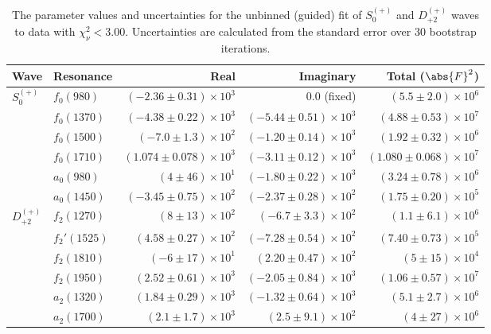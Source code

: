 \begin{table}[ht]
    \begin{center}
        \begin{tabular}{llrrr}\toprule
        Wave & Resonance & Real & Imaginary & Total ($\abs{F}^2$) \\\midrule
$S_{0}^{(+)}$ & $f_{0}(980)$ & $(-2.36 \pm 0.31) \times 10^{3}$ & $0.0$ (fixed) & $(5.5 \pm 2.0) \times 10^{6}$ \\
 & $f_{0}(1370)$ & $(-4.38 \pm 0.22) \times 10^{3}$ & $(-5.44 \pm 0.51) \times 10^{3}$ & $(4.88 \pm 0.53) \times 10^{7}$ \\
 & $f_{0}(1500)$ & $(-7.0 \pm 1.3) \times 10^{2}$ & $(-1.20 \pm 0.14) \times 10^{3}$ & $(1.92 \pm 0.32) \times 10^{6}$ \\
 & $f_{0}(1710)$ & $(1.074 \pm 0.078) \times 10^{3}$ & $(-3.11 \pm 0.12) \times 10^{3}$ & $(1.080 \pm 0.068) \times 10^{7}$ \\
 & $a_{0}(980)$ & $(4 \pm 46) \times 10^{1}$ & $(-1.80 \pm 0.22) \times 10^{3}$ & $(3.24 \pm 0.78) \times 10^{6}$ \\
 & $a_{0}(1450)$ & $(-3.45 \pm 0.75) \times 10^{2}$ & $(-2.37 \pm 0.28) \times 10^{2}$ & $(1.75 \pm 0.20) \times 10^{5}$ \\
$D_{+2}^{(+)}$ & $f_{2}(1270)$ & $(8 \pm 13) \times 10^{2}$ & $(-6.7 \pm 3.3) \times 10^{2}$ & $(1.1 \pm 6.1) \times 10^{6}$ \\
 & $f_{2}'(1525)$ & $(4.58 \pm 0.27) \times 10^{2}$ & $(-7.28 \pm 0.54) \times 10^{2}$ & $(7.40 \pm 0.73) \times 10^{5}$ \\
 & $f_{2}(1810)$ & $(-6 \pm 17) \times 10^{1}$ & $(2.20 \pm 0.47) \times 10^{2}$ & $(5 \pm 15) \times 10^{4}$ \\
 & $f_{2}(1950)$ & $(2.52 \pm 0.61) \times 10^{3}$ & $(-2.05 \pm 0.84) \times 10^{3}$ & $(1.06 \pm 0.57) \times 10^{7}$ \\
 & $a_{2}(1320)$ & $(1.84 \pm 0.29) \times 10^{3}$ & $(-1.32 \pm 0.64) \times 10^{3}$ & $(5.1 \pm 2.7) \times 10^{6}$ \\
 & $a_{2}(1700)$ & $(2.1 \pm 1.7) \times 10^{3}$ & $(2.5 \pm 9.1) \times 10^{2}$ & $(4 \pm 27) \times 10^{6}$ \\\bottomrule
        \end{tabular}
    \caption{The parameter values and uncertainties for the unbinned (guided) fit of $S_{0}^{(+)}$ and $D_{+2}^{(+)}$ waves to data with $\chi^2_\nu < 3.00$. Uncertainties are calculated from the standard error over $30$ bootstrap iterations.}\label{tab:unbinned-fit-chisqdof-3.0-guided-Sp0p-Dp2p}
    \end{center}
\end{table}
